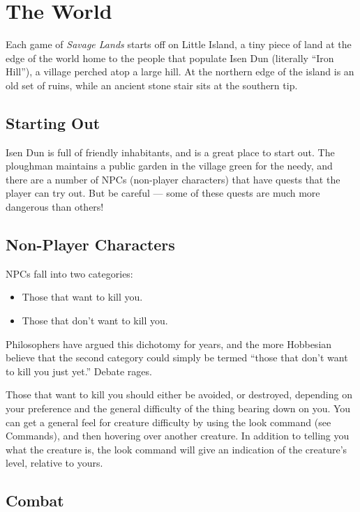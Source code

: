 \section{The World}

Each game of {\it Savage Lands} starts off on Little Island, a tiny piece
of land at the edge of the world home to the people that populate Isen Dun
(literally ``Iron Hill''), a village perched atop a large hill.  At the
northern edge of the island is an old set of ruins, while an ancient stone
stair sits at the southern tip.

\subsection{Starting Out}

Isen Dun is full of friendly inhabitants, and is a great place to start
out.  The ploughman maintains a public garden in the village green for the
needy, and there are a number of NPCs (non-player characters) that have
quests that the player can try out.  But be careful --- some of these quests
are much more dangerous than others! 

\subsection{Non-Player Characters}

NPCs fall into two categories:

\begin{itemize}
\item Those that want to kill you.
\item Those that don't want to kill you.
\end{itemize}

Philosophers have argued this dichotomy for years, and the more Hobbesian
believe that the second category could simply be termed ``those that don't
want to kill you just yet.''  Debate rages.

Those that want to kill you should either be avoided, or destroyed,
depending on your preference and the general difficulty of the thing
bearing down on you.  You can get a general feel for creature difficulty
by using the look command (see Commands), and then hovering over another 
creature.  In addition to telling you what the creature is, the look 
command will give an indication of the creature's level, relative to yours.

\subsection{Combat}

